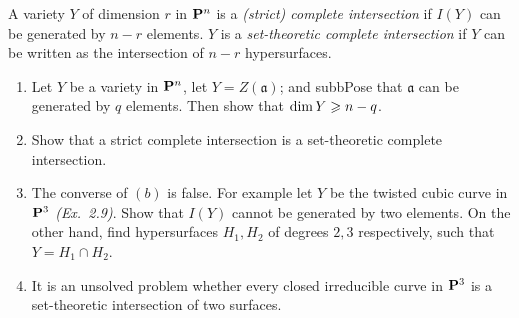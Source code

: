 \documentclass[10pt]{amsart}
\begin{document}
\begin{solution}
    
\end{solution}

\begin{exercise}[2.17]
    A variety $Y$ of dimension $r$ in ${\bf P}^n$ is a \emph{(strict) complete
    intersection} if $I(Y)$ can be generated by $n-r$ elements. $Y$ is a
    \emph{set-theoretic complete intersection} if $Y$ can be written as the
    intersection of $n-r$ hypersurfaces.
    \begin{enumerate}
    \item Let $Y$ be a variety in ${\bf P}^n$, let $Y = Z(\mathfrak{a})$; and
    subbPose that $\mathfrak{a}$ can be generated by $q$ elements. Then show
    that $\operatorname{\rm{dim}} Y \geqslant n-q$. 
    \item Show that a strict complete intersection is a set-theoretic complete
    intersection.
    \item The converse of $(b)$ is false. For example let $Y$ be the twisted
    cubic curve in ${\bf P}^3$ {\emph{(Ex.\ 2.9)}}. Show that
    $I(Y)$ cannot be generated by two elements. On the other hand, find
    hypersurfaces $H_1,H_2$ of degrees $2,3$ respectively, such that
    $Y = H_1 \cap H_2$. 
    \item It is an unsolved problem whether every closed irreducible curve in
    ${\bf P}^3$ is a set-theoretic intersection of two surfaces.
    \end{enumerate}
\end{exercise}

\begin{solution}
    
\end{solution}
\end{document}
